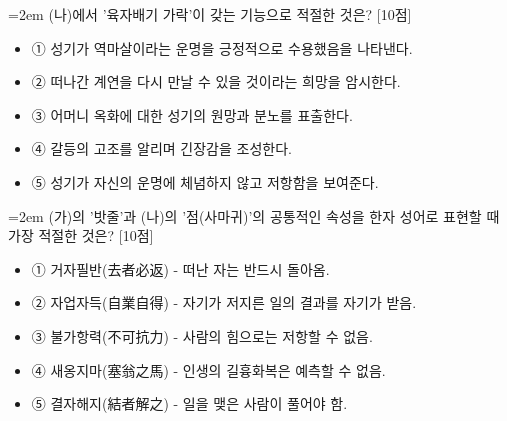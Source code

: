 \documentclass[10pt,a4paper]{article}
\newcommand{\qnum}[1]{%
  \tikz[baseline=(num.base)]{%
    \node[circle, fill=numCircle, text=white, inner sep=0pt,
          minimum size=18pt, font=\small\bfseries] (num) {#1};%
  }%
}
\newcommand{\pts}[1]{%
  \hfill\textcolor{ptsBadge}{[#1점]}%
}
\begin{document}
\vspace{4mm}
\begin{minipage}{\columnwidth}
{\hangindent=2em
\qnum{7}\enspace (나)에서 '육자배기 가락'이 갖는 기능으로 적절한 것은? \pts{10}
\par}

\vspace{3mm}
\begin{itemize}[leftmargin=2.5em, labelsep=0.3em, label={}, itemsep=4pt, parsep=1pt, topsep=0pt]
  \item ① 성기가 역마살이라는 운명을 긍정적으로 수용했음을 나타낸다.
  \item ② 떠나간 계연을 다시 만날 수 있을 것이라는 희망을 암시한다.
  \item ③ 어머니 옥화에 대한 성기의 원망과 분노를 표출한다.
  \item ④ 갈등의 고조를 알리며 긴장감을 조성한다.
  \item ⑤ 성기가 자신의 운명에 체념하지 않고 저항함을 보여준다.
\end{itemize}
\end{minipage}
\vspace{4mm}

\vspace{4mm}
\begin{minipage}{\columnwidth}
{\hangindent=2em
\qnum{8}\enspace (가)의 '밧줄'과 (나)의 '점(사마귀)'의 공통적인 속성을 한자 성어로 표현할 때 가장 적절한 것은? \pts{10}
\par}

\vspace{3mm}
\begin{itemize}[leftmargin=2.5em, labelsep=0.3em, label={}, itemsep=4pt, parsep=1pt, topsep=0pt]
  \item ① 거자필반(去者必返) - 떠난 자는 반드시 돌아옴.
  \item ② 자업자득(自業自得) - 자기가 저지른 일의 결과를 자기가 받음.
  \item ③ 불가항력(不可抗力) - 사람의 힘으로는 저항할 수 없음.
  \item ④ 새옹지마(塞翁之馬) - 인생의 길흉화복은 예측할 수 없음.
  \item ⑤ 결자해지(結者解之) - 일을 맺은 사람이 풀어야 함.
\end{itemize}
\end{minipage}
\vspace{4mm}
\end{document}
